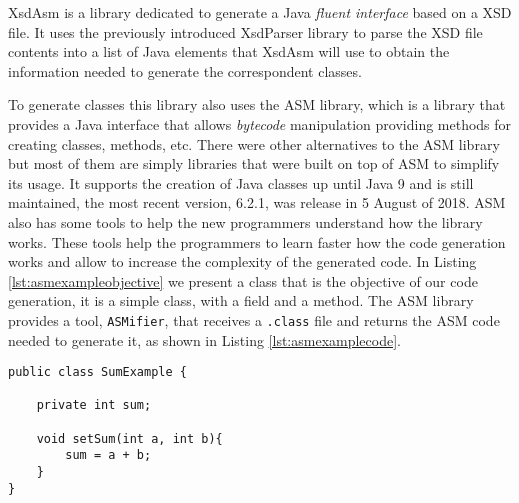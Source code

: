 XsdAsm is a library dedicated to generate a Java \textit{fluent interface} based on a \ac{XSD} file. It uses the previously introduced XsdParser library to parse the \ac{XSD} file contents into a list of Java elements that XsdAsm will use to obtain the information needed to generate the correspondent classes. 

\noindent
To generate classes this library also uses the ASM\cite{asm} library, which is a library that provides a Java interface that allows \textit{bytecode} manipulation providing methods for creating classes, methods, etc. There were other alternatives to the ASM library but most of them are simply libraries that were built on top of ASM to simplify its usage. It supports the creation of Java classes up until Java 9 and is still maintained, the most recent version, 6.2.1, was release in 5 August of 2018. ASM also has some tools to help the new programmers understand how the library works. These tools help the programmers to learn faster how the code generation works and allow to increase the complexity of the generated code. In Listing \ref{lst:asmexampleobjective} we present a class that is the objective of our code generation, it is a simple class, with a field and a method. The ASM library provides a tool, \texttt{ASMifier}, that receives a \texttt{.class} file and returns the ASM code needed to generate it, as shown in Listing \ref{lst:asmexamplecode}.

\bigskip


\begin{minipage}{\linewidth}
\begin{lstlisting}[caption={ASM Example - Code Generation Objective},captionpos=b,label={lst:asmexampleobjective}]
public class SumExample {

    private int sum;

    void setSum(int a, int b){
        sum = a + b;
    }
}
\end{lstlisting}
\end{minipage}

\bigskip


